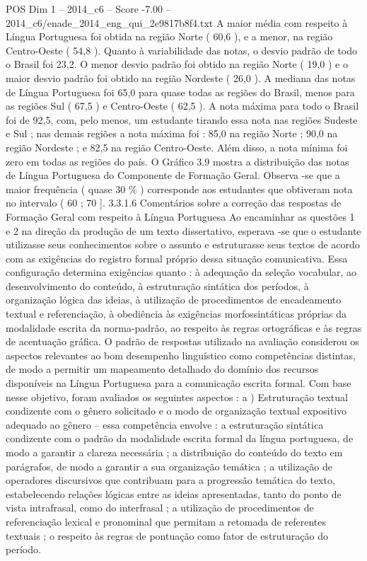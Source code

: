 \begin{textsample}{POS Dim 1 – 2014\_c6 – Score -7.00 – 2014\_c6/enade\_2014\_eng\_qui\_2e9817b8f4.txt}
A maior média com respeito à Língua Portuguesa foi obtida na região Norte ( 60,6 ), e a menor, na região Centro-Oeste ( 54,8 ).
Quanto à variabilidade das notas, o desvio padrão de todo o Brasil foi 23,2.
O menor desvio padrão foi obtido na região Norte ( 19,0 ) e o maior desvio padrão foi obtido na região Nordeste ( 26,0 ).
A mediana das notas de Língua Portuguesa foi 65,0 para quase todas as regiões do Brasil, menos para as regiões Sul ( 67,5 ) e Centro-Oeste ( 62,5 ).
A nota máxima para todo o Brasil foi de 92,5, com, pelo menos, um estudante tirando essa nota nas regiões Sudeste e Sul ; nas demais regiões a nota máxima foi : 85,0 na região Norte ; 90,0 na região Nordeste ; e 82,5 na região Centro-Oeste.
Além disso, a nota mínima foi zero em todas as regiões do país.
O Gráfico 3.9 mostra a distribuição das notas de Língua Portuguesa do Componente de Formação Geral.
Observa -se que a maior frequência ( quase 30 \% ) corresponde aos estudantes que obtiveram nota no intervalo ( 60 ; 70 ]. 3.3.1.6 Comentários sobre a correção das respostas de Formação Geral com respeito à Língua Portuguesa Ao encaminhar as questões 1 e 2 na direção da produção de um texto dissertativo, esperava -se que o estudante utilizasse seus conhecimentos sobre o assunto e estruturasse seus textos de acordo com as exigências do registro formal próprio dessa situação comunicativa.
Essa configuração determina exigências quanto : à adequação da seleção vocabular, ao desenvolvimento do conteúdo, à estruturação sintática dos períodos, à organização lógica das ideias, à utilização de procedimentos de encadeamento textual e referenciação, à obediência às exigências morfossintáticas próprias da modalidade escrita da norma-padrão, ao respeito às regras ortográficas e às regras de acentuação gráfica.
O padrão de respostas utilizado na avaliação considerou os aspectos relevantes ao bom desempenho linguístico como competências distintas, de modo a permitir um mapeamento detalhado do domínio dos recursos disponíveis na Língua Portuguesa para a comunicação escrita formal.
Com base nesse objetivo, foram avaliados os seguintes aspectos : a ) Estruturação textual condizente com o gênero solicitado e o modo de organização textual expositivo adequado ao gênero – essa competência envolve : a estruturação sintática condizente com o padrão da modalidade escrita formal da língua portuguesa, de modo a garantir a clareza necessária ; a distribuição do conteúdo do texto em parágrafos, de modo a garantir a sua organização temática ; a utilização de operadores discursivos que contribuam para a progressão temática do texto, estabelecendo relações lógicas entre as ideias apresentadas, tanto do ponto de vista intrafrasal, como do interfrasal ; a utilização de procedimentos de referenciação lexical e pronominal que permitam a retomada de referentes textuais ; o respeito às regras de pontuação como fator de estruturação do período.

\end{textsample}
